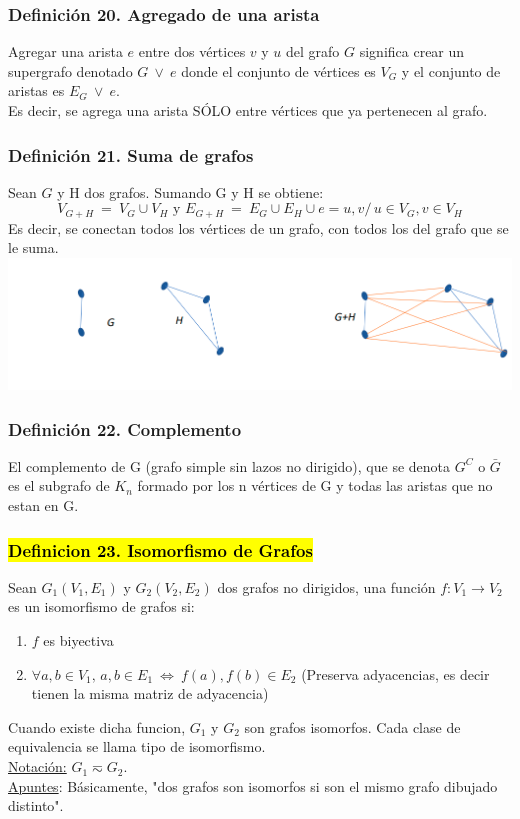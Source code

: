 \documentclass{article}
\newcommand{\comma}{,\,}                                %
\newcommand{\tq}{/\,}                                   %
\newcommand{\vees}{\:\vee\:}                            %
\newcommand{\eq}{\:=\:}                                 %
\newcommand{\Leftrightarrows}{\: \Leftrightarrow \:}    %
\begin{document}
\subsubsection*{Definición 20. Agregado de una arista}
Agregar una arista $e$ entre dos vértices $v$ y $u$ del grafo $G$ significa crear un supergrafo denotado $G \vees {e}$ donde el conjunto de vértices es $V_G$ y el conjunto de aristas es $E_G \vees {e}$.
\\Es decir, se agrega una arista SÓLO entre vértices que ya pertenecen al grafo.

\subsubsection*{Definición 21. Suma de grafos}
Sean $G$ y H dos grafos. Sumando G y H se obtiene:
\begin{equation*}
   V_{G+H} \eq V_G \cup V_H \text{ y } E_{G+H} \eq E_G \cup E_H \cup {e={u,v} \tq u \in V_G, v \in V_H}
\end{equation*}
Es decir, se conectan todos los vértices de un grafo, con todos los del grafo que se \nolinebreak[4] le suma.
\\\includegraphics[width=\textwidth]{suma-grafos.PNG}

\subsubsection*{Definición 22. Complemento}
El complemento de G (grafo simple sin lazos no dirigido), que se denota $G^C$ o $\bar{G}$
es el subgrafo de $K_n$ formado por los n vértices de G y todas las aristas que no estan en G.

\subsubsection*{\hl{Definicion 23. Isomorfismo de Grafos}}
Sean $G_1(V_1, E_1)$ y $G_2(V_2, E_2)$ dos grafos no dirigidos, una función $f: V_1 \rightarrow V_2$ es un isomorfismo de grafos si:
\begin{enumerate}
    \item $f$ es biyectiva
    \item $\forall a,b \in V_1 \comma {a,b} \in E_1 \Leftrightarrows {f(a), f(b)} \in E_2$ (Preserva adyacencias, es decir tienen la misma matriz de adyacencia)
\end{enumerate}
Cuando existe dicha funcion, $G_1$ y $G_2$ son grafos isomorfos.
Cada clase de equivalencia se llama tipo de isomorfismo.
\\\underline{Notación:} $G_1 \eqsim G_2$.
\\\underline{Apuntes}: Básicamente, "dos grafos son isomorfos si son el mismo grafo dibujado distinto".
\end{document}
